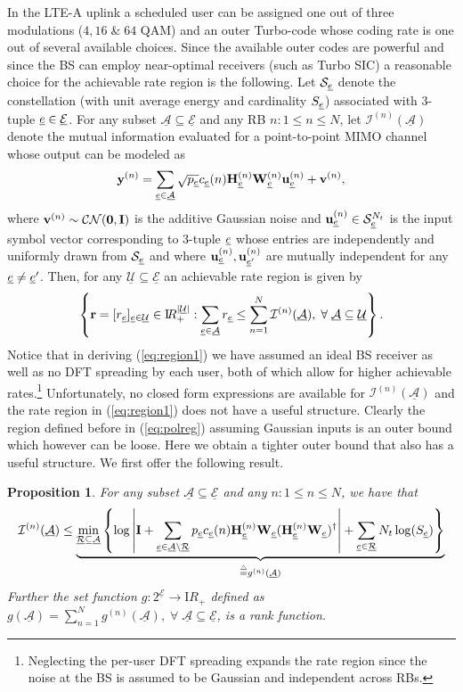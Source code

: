 \documentclass[11pt] {article}
\newcommand{\Reals}     {{{\mathrm I\!R}}}  \newcommand{\Cplx}      {{{\mathsf I}\!\!\!{\mathrm C}}} \newcommand{\NCplx}     {{{\mathcal{CN}}}} \newcommand{\Ints}      {{{\mathbb Z}}} \newcommand{\Rats}      {{{\mathsf I}\!\!\!{\mathrm Q}}}    \newcommand{\Nats}      {{{\mathrm{ I\!N}}}} \newcommand{\Tee}{      {{\mathbb T}}}
\newcommand{\Zrb}     {{\uwti 0}}      \newcommand{\Oneb}    {{\uwti 1}}
\newcommand{\uwti}[1]{{\mathbf #1}}
\newcommand{\rb}{{\uwti r}}  \newcommand{\Rb}{{\uwti R}}
\newcommand{\ub}{{\uwti u}}  \newcommand{\Ub}{{\uwti U}}
\newcommand{\vb}{{\uwti v}}  \newcommand{\Vb}{{\uwti V}}
\newcommand{\yb}{{\uwti y}}  \newcommand{\Yb}{{\uwti Y}}
\newcommand{\Cc} {{\mathcal C}}         \newcommand{\Ck} {{\bm {\mathcal C}}}
\newcommand{\Ic} {{\mathcal I}}         \newcommand{\Ik} {{\bm {\mathcal I}}}
\newcommand{\Nc} {{\mathcal N}}         \newcommand{\Nk} {{\bm {\mathcal N}}}
\newcommand{\Sc} {{\mathcal S}}         \newcommand{\Sk} {{\bm {\mathcal S}}}
\newcommand{\Aulc} {{\underline{\mathcal A}}}
\newcommand{\Uulc} {{\underline{\mathcal U}}}
\newcommand{\Eulc} {{\underline{\mathcal E}}}
\newcommand{\Rulc} {{\underline{\mathcal R}}}
\newtheorem{proposition}{Proposition}
\begin{document}
In the LTE-A uplink a scheduled user can be assigned one out of three modulations ($4,16\;\&\;64$ QAM) and an outer Turbo-code whose coding rate is one out of several available choices. Since the available outer codes are powerful and since the BS can employ near-optimal receivers (such as Turbo SIC) a reasonable choice for the achievable rate region is the following. Let $\Sc_{\eul}$ denote the constellation (with unit average energy and cardinality $S_{{\underline e}}$) associated with 3-tuple $\eul\in\Eulc$. For any subset $\Aulc\subseteq \Eulc$ and any RB $n:1\leq n\leq N$, let $\Ic^{(n)}(\Aulc)$ denote the mutual information evaluated for a point-to-point MIMO channel whose output can be modeled as
\begin{equation}\label{eq:propfinmod}
\yb^{(n)}=\sum_{\eul\in\Aulc}\sqrt{p_{\eul}}c_{\eul}(n)\Hb^{(n)}_{\eul}\Wb^{(n)}_{\eul}\ub^{(n)}_{\eul} + \vb^{(n)},
\end{equation}
 where $\vb^{(n)}\sim\Cc\Nc(\Zrb,\Ib)$ is the additive Gaussian noise and $\ub^{(n)}_{\eul}\in\Sc_{\eul}^{N_t}$ is the input symbol vector corresponding to 3-tuple ${\underline e}$ whose entries are independently and uniformly drawn from $\Sc_{\eul}$ and where $\ub^{(n)}_{\eul},\ub^{(n)}_{\eul'}$ are mutually independent for any ${\underline e}\neq{\underline e}'$.
 Then, for any $\Uulc\subseteq \Eulc$ an achievable rate region is given by
   \begin{eqnarray}\label{eq:region1}
 \left\{\rb=[r_{\eul}]_{\eul\in\Uulc}\in\Reals_+^{|\Uulc|}:\sum_{\eul\in\Aulc}r_{\eul}\leq \sum_{n=1}^N\Ic^{(n)}(\Aulc),\;\forall\;\Aulc\subseteq\Uulc\right\}.
 \end{eqnarray}
 Notice that in deriving (\ref{eq:region1}) we have assumed an ideal BS receiver as well as no DFT spreading by each user, both of which allow for higher achievable rates.\footnote{Neglecting the per-user  DFT spreading expands the rate region since the noise at the BS is assumed to be Gaussian and independent across RBs.}
 Unfortunately, no closed form expressions are available for $\Ic^{(n)}(\Aulc)$
  and the rate region in (\ref{eq:region1}) does not have a useful structure. Clearly the region defined before in (\ref{eq:polreg}) assuming Gaussian inputs is an outer bound which however can be loose. Here we obtain a tighter outer bound that also has a useful structure. We first offer the following result.
  \begin{proposition}\label{propfin}
  For any subset $\Aulc\subseteq \Eulc$  and any $n:1\leq n\leq N$, we have that
  \begin{eqnarray} \label{eq:propfin1}
   \Ic^{(n)}(\Aulc)\leq \underbrace{\min_{\Rulc\subseteq \Aulc}\left\{\log\left|\Ib+\sum_{\eul\in\Aulc\setminus\Rulc}p_{\eul}c_{\eul}(n)\Hb_{\eul}^{(n)}\Wb_{\eul}(\Hb_{\eul}^{(n)}\Wb_{\eul})^{\dag}\right|+  \sum_{\eul\in\Rulc}N_t\log(S_{\eul})\right\}}_{\define g^{(n)}(\Aulc)}
 \end{eqnarray}
 Further the set function $g:2^{\Eulc}\to\Reals_+$ defined as $g(\Aulc)=\sum_{n=1}^Ng^{(n)}(\Aulc),\;\forall\;\Aulc\subseteq\Eulc$, is a rank function.
  \end{proposition}
\end{document}

